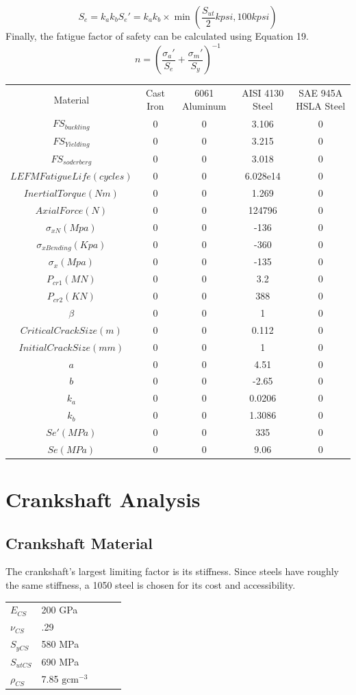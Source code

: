 \documentclass[10pt,a4paper]{article}
\begin{document}
\[{S_e} = {k_a}{k_b}{S_e}' = {k_a}{k_b} \times \min \left( {\frac{{{S_{ut}}}}{2}kpsi,100kpsi} \right)\]
Finally, the fatigue factor of safety can be calculated using Equation 19.
\[n = {\left( {\frac{{{\sigma _a}'}}{{{S_e}}} + \frac{{{\sigma _m}'}}{{{S_y}}}} \right)^{ - 1}}\]
\begin{center}
\begin{tabular}{ |c|c|c|c|c| }
 \hline
	Material & Cast Iron & 6061 Aluminum &  AISI 4130 Steel & SAE 945A HSLA Steel\\
	$FS_{buckling}$ & 0 & 0 &  3.106 & 0 \\
	$FS_{Yielding}$ & 0 & 0 &  3.215 & 0 \\
	$FS_{soderberg}$ & 0 & 0 &  3.018 & 0 \\
	$LEFM Fatigue Life (cycles)$ & 0 & 0 &  6.028e14 & 0 \\
	$Inertial Torque(N m)$ & 0 & 0 &  1.269 & 0 \\
	$Axial Force (N)$  & 0 & 0 &  124796 & 0 \\
	$\sigma_{xN} (Mpa) $  & 0 & 0 &  -136 & 0 \\
	$\sigma_{xBending} (Kpa)$  & 0 & 0 &  -360 & 0 \\
	$\sigma_{x} (Mpa)$ & 0 & 0 &  -135& 0 \\
	$P_{cr1} (MN)$  & 0 & 0 &  3.2 & 0 \\
	$P_{cr2} (KN)$  & 0 & 0 &  388 & 0 \\
	$\beta$ & 0 & 0 &  1 & 0 \\
	$Critical Crack Size (m)$ & 0 & 0 & 0.112  & 0 \\
	$Initial Crack Size (mm)$ & 0 & 0 &  1 & 0 \\
	$a $  & 0 & 0 &  4.51 & 0 \\
	$b $  & 0 & 0 & -2.65  & 0 \\
	$k_{a} $  & 0 & 0 &  0.0206 & 0 \\
	$k_{b} $  & 0 & 0 &  1.3086 & 0 \\
	$Se' (MPa)$  & 0 & 0 &  335 & 0 \\
	$Se (MPa)$  & 0 & 0 &  9.06 & 0 \\
 \hline
\end{tabular}
\end{center}
\newpage
\section*{Crankshaft Analysis}
\subsection*{Crankshaft Material}
The crankshaft's largest limiting factor is its stiffness. Since steels have roughly the same stiffness, a 1050 steel is chosen for its cost and accessibility.
\begin{table}[H]
\begin{tabular}{lllll}
$E_{CS}$ & 200 GPa  \\
 $\nu_{CS}$&  .29   \\
 $S_{y CS}$&  580 MPa  \\
 $S_{ut CS}$&  690 MPa  \\
 $\rho_{CS}$& 7.85 $\text{g}\text{cm}^{-3}$  
\end{tabular}
\end{table}
\end{document}
